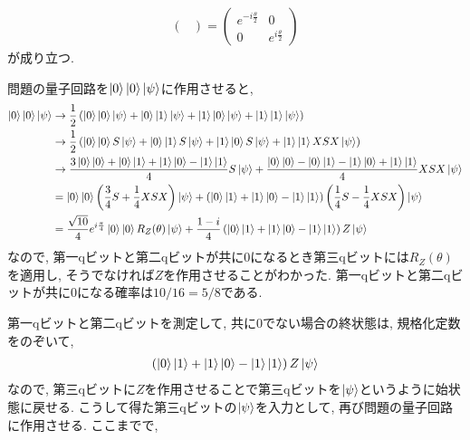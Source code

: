 \begin{ex}
\begin{align*}
\begin{pmatrix}
        \end{pmatrix}
        =
        \begin{pmatrix}
            e^{- i \frac{\theta}{2}} & 0                      \\
            0                        & e^{i \frac{\theta}{2}}
        \end{pmatrix}
    \end{align*}
    が成り立つ.
    \par
    問題の量子回路を$\ket{0} \ket{0} \ket{\psi}$に作用させると,
    \begin{align*}
        \ket{0} \ket{0} \ket{\psi}
         & \rightarrow
        \frac{1}{2}
        \left(
        \ket{0} \ket{0} \ket{\psi} +\ket{0} \ket{1} \ket{\psi}
        +\ket{1} \ket{0} \ket{\psi}  + \ket{1} \ket{1} \ket{\psi}
        \right)
        \\
         & \rightarrow
        \frac{1}{2}
        \left(
        \ket{0} \ket{0} S\ket{\psi} +\ket{0} \ket{1} S\ket{\psi}
        +\ket{1} \ket{0} S\ket{\psi}  + \ket{1} \ket{1} XSX\ket{\psi}
        \right)
        \\
         & \rightarrow
        \frac{3\ket{0} \ket{0} +\ket{0} \ket{1}
            +\ket{1} \ket{0} - \ket{1} \ket{1} }{4} S\ket{\psi}
        +
        \frac{\ket{0} \ket{0} -\ket{0} \ket{1}
            -\ket{1} \ket{0} + \ket{1} \ket{1} }{4} XSX\ket{\psi}
        \\
         & =
        \ket{0} \ket{0} \left(\frac{3}{4}S +\frac{1}{4} XSX  \right)\ket{\psi}
        +
        \left(\ket{0}\ket{1} + \ket{1}\ket{0} - \ket{1} \ket{1}\right)
        \left(\frac{1}{4}S - \frac{1}{4}XSX\right)\ket{\psi}
        \\
         & =
        \frac{\sqrt{10}}{4} e^{i \frac{\pi}{4}}\ket{0} \ket{0} R_Z(\theta) \ket{\psi}
        +
        \frac{1-i}{4}\left(\ket{0}\ket{1} + \ket{1}\ket{0} - \ket{1} \ket{1}\right)
        Z\ket{\psi}
    \end{align*}
    なので, 第一qビットと第二qビットが共に0になるとき第三qビットには$R_Z(\theta)$を適用し, そうでなければ$Z$を作用させることがわかった. 第一qビットと第二qビットが共に0になる確率は$10/16 = 5/8$である.
    \par
    第一qビットと第二qビットを測定して, 共に0でない場合の終状態は, 規格化定数をのぞいて,
    \begin{align*}
        \left(\ket{0}\ket{1} + \ket{1}\ket{0} - \ket{1} \ket{1}\right)
        Z\ket{\psi}
    \end{align*}
    なので, 第三qビットに$Z$を作用させることで第三qビットを$\ket{\psi}$というように始状態に戻せる. こうして得た第三qビットの$\ket{\psi}$を入力として, 再び問題の量子回路に作用させる. ここまでで,

\end{ex}
